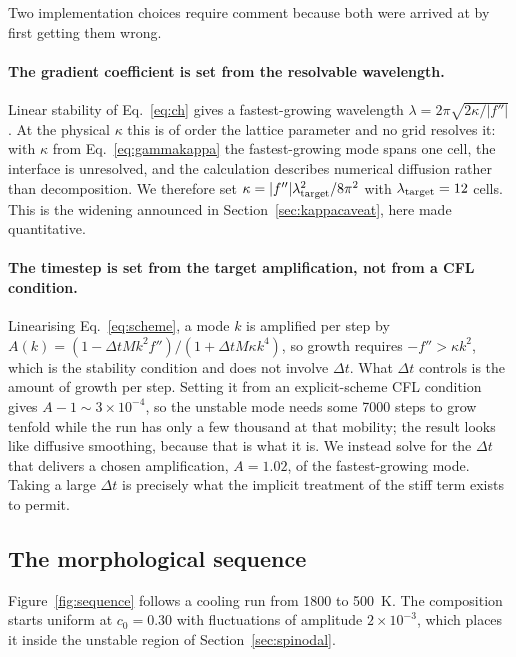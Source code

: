 \documentclass[preprint,12pt,authoryear]{elsarticle}
\begin{document}
Two implementation choices require comment because both were arrived at by
first getting them wrong.

\paragraph{The gradient coefficient is set from the resolvable wavelength.}
Linear stability of Eq.~\eqref{eq:ch} gives a fastest-growing wavelength
$\lambda = 2\pi\sqrt{2\kappa/|f''|}$. At the physical $\kappa$ this is of order
the lattice parameter and no grid resolves it: with $\kappa$ from
Eq.~\eqref{eq:gammakappa} the fastest-growing mode spans one cell, the interface
is unresolved, and the calculation describes numerical diffusion rather than
decomposition. We therefore set $\kappa = |f''|\lambda_{\rm target}^2/8\pi^2$
with $\lambda_{\rm target} = 12$ cells. This is the widening announced in
Section~\ref{sec:kappacaveat}, here made quantitative.

\paragraph{The timestep is set from the target amplification, not from a CFL
condition.} Linearising Eq.~\eqref{eq:scheme}, a mode $k$ is amplified per step
by $A(k) = (1 - \Delta t M k^2 f'')/(1 + \Delta t M \kappa k^4)$, so growth
requires $-f'' > \kappa k^2$, which is the stability condition and does not
involve $\Delta t$. What $\Delta t$ controls is the amount of growth per step.
Setting it from an explicit-scheme CFL condition gives $A - 1 \sim 3\times
10^{-4}$, so the unstable mode needs some 7000 steps to grow tenfold while the
run has only a few thousand at that mobility; the result looks like diffusive
smoothing, because that is what it is. We instead solve for the $\Delta t$ that
delivers a chosen amplification, $A = 1.02$, of the fastest-growing mode. Taking
a large $\Delta t$ is precisely what the implicit treatment of the stiff term
exists to permit.

\subsection{The morphological sequence}

Figure~\ref{fig:sequence} follows a cooling run from 1800 to 500~K. The
composition starts uniform at $c_0 = 0.30$ with fluctuations of amplitude
$2\times10^{-3}$, which places it inside the unstable region of
Section~\ref{sec:spinodal}.
\end{document}
